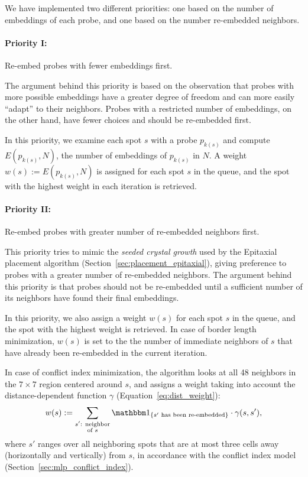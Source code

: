 We have implemented two different priorities: one based on the number of
embeddings of each probe, and one based on the number re-embedded neighbors.

\paragraph{Priority I:} Re-embed probes with fewer embeddings first.

The argument behind this priority is based on the observation that probes with
more possible embeddings have a greater degree of freedom and can more easily
``adapt'' to their neighbors. Probes with a restricted number of embeddings, on
the other hand, have fewer choices and should be re-embedded first.

In this priority, we examine each spot $s$ with a probe $p_{k(s)}$ and compute
$E(p_{k(s)},N)$, the number of embeddings of $p_{k(s)}$ in $N$. A weight
$w(s) := E(p_{k(s)},N)$ is assigned for each spot $s$ in the queue, and the spot
with the highest weight in each iteration is retrieved.

\paragraph{Priority II:} Re-embed probes with greater number of re-embedded
neighbors first.

This priority tries to mimic the \emph{seeded crystal growth} used by the
Epitaxial placement algorithm (Section~\ref{sec:placement_epitaxial}), giving
preference to probes with a greater number of re-embedded neighbors. The
argument behind this priority is that probes should not be re-embedded until a
sufficient number of its neighbors have found their final embeddings.

In this priority, we also assign a weight $w(s)$ for each spot $s$ in the queue,
and the spot with the highest weight is retrieved. In case of border length
minimization, $w(s)$ is set to the the number of immediate neighbors of $s$ that
have already been re-embedded in the current iteration.

In case of conflict index minimization, the algorithm looks at all 48 neighbors
in the $7\times 7$ region centered around $s$, and assigns a weight taking into
account the distance-dependent function $\gamma$
(Equation~\ref{eq:dist_weight}):
\[
w(s) := \sum_{\substack{s'\text{: neighbor}\\\text{of } s}}
        \Ind{s'\text{ has been re-embedded}}
        \cdot \gamma(s,s'),
\]
where $s'$ ranges over all neighboring spots that are at most three cells away
(horizontally and vertically) from $s$, in accordance with the conflict index
model (Section~\ref{sec:mlp_conflict_index}).

